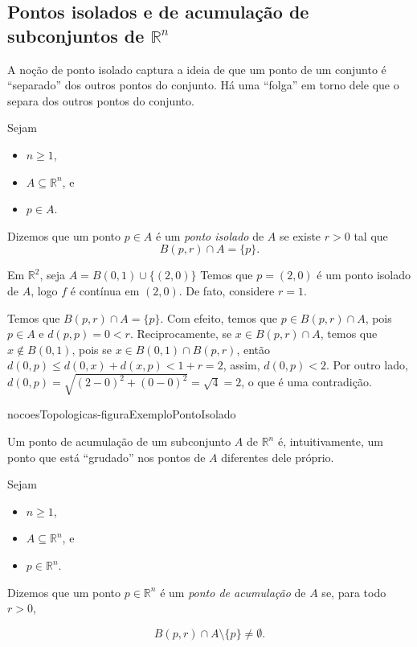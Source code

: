 \subsection{Pontos isolados e de acumulação de subconjuntos de \texorpdfstring{$\mathbb R^n$}{Rn}}

A noção de ponto isolado captura a ideia de que um ponto de um conjunto é ``separado'' dos outros pontos do conjunto.
Há uma ``folga'' em torno dele que o separa dos outros pontos do conjunto.

\begin{definition}
    Sejam
    \begin{itemize}
        \item $n\geq 1$,
        \item $A\subseteq \mathbb R^n$, e\
        \item $p \in A$.
    \end{itemize}
    Dizemos que um ponto $p \in A$ é um \emph{ponto isolado} de $A$ se existe $r>0$ tal que
    \[
        B(p, r)\cap A = \{p\}.
    \]
\end{definition}

\begin{example}
    Em $\mathbb R^2$, seja $A = B(0, 1)\cup \{(2, 0)\}$ 
    Temos que $p=(2, 0)$ é um ponto isolado de $A$, logo $f$ é contínua em $(2, 0)$.
    De fato, considere $r=1$.
    
    Temos que $B(p, r)\cap A=\{p\}$.
    Com efeito, temos que $p\in B(p, r)\cap A$, pois $p \in A$ e $d(p, p) = 0 < r$.
    Reciprocamente, se $x \in B(p, r)\cap A$, temos que $x\notin B(0, 1)$, pois se $x \in B(0, 1)\cap B(p, r)$, então $d(0, p) \leq d(0, x) + d(x, p) < 1 + r = 2$, assim, $d(0, p)<2$.
    Por outro lado, $d(0, p)=\sqrt{(2-0)^2 + (0-0)^2} = \sqrt{4} = 2$, o que é uma contradição.
\end{example}

{nocoesTopologicas-figuraExemploPontoIsolado}

Um ponto de acumulação de um subconjunto $A$ de $\mathbb R^n$ é, intuitivamente, um ponto que está ``grudado'' nos pontos de $A$ diferentes dele próprio.

\begin{definition}
    Sejam
    \begin{itemize}
    \item $n\geq 1$,
    \item $A\subseteq\mathbb R^n$, e
    \item $p \in \mathbb R^n$.
    \end{itemize}
    Dizemos que um ponto $p \in \mathbb R^n$ é um \emph{ponto de acumulação} de $A$ se, para todo $r>0$,
    
    \[
        B(p, r)\cap A\setminus\{p\}\neq \emptyset.
    \]
\end{definition}

